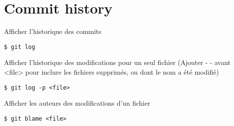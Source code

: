 \section*{Commit history}

Afficher l'historique des commits
\begin{lstlisting}
$ git log
\end{lstlisting}
Afficher l'historique des modifications pour un seul fichier (Ajouter - - avant <file> pour inclure les fichiers supprimés, ou dont le nom a été modifié)
\begin{lstlisting}
$ git log -p <file>
\end{lstlisting}
Afficher les auteurs des modifications d'un fichier
\begin{lstlisting}
$ git blame <file>
\end{lstlisting}